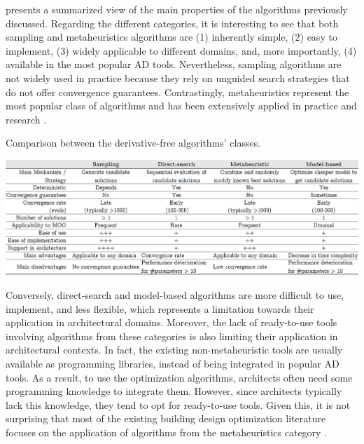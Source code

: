 	 presents a summarized view of the main properties of the algorithms previously discussed. Regarding the different categories, it is interesting to see that both sampling and metaheuristics algorithms are (1) inherently simple, (2) easy to implement, (3) widely applicable to different domains, and, more importantly, (4) available in the most popular \ac{AD} tools. Nevertheless, sampling algorithms are not widely used in practice because they rely on unguided search strategies that do not offer convergence guarantees. Contrastingly, metaheuristics represent the most popular class of algorithms and has been extensively applied in practice and research \cite{Wortmann2017ADO}. 
	\begin{table}[hp]	
		\centering	
		\caption{Comparison between the derivative-free algorithms' classes.}	
		\includegraphics[width=1\textwidth]{tables_and_code/algorithms_comparison.PNG}
		\label{table:compare-dfo-algos}	
	\end{table}
	Conversely, direct-search and model-based algorithms are more difficult to use, implement, and less flexible, which represents a limitation towards their application in architectural domains. Moreover, the lack of ready-to-use tools involving algorithms from these categories is also limiting their application in architectural contexts. In fact, the existing non-metaheuristic tools are usually available as programming libraries, instead of being integrated in popular \ac{AD} tools. As a result, to use the optimization algorithms, architects often need some programming knowledge to integrate them. However, since architects typically lack this knowledge, they tend to opt for ready-to-use tools. Given this, it is not surprising that most of the existing building design optimization literature focuses on the application of algorithms from the metaheuristics category \cite{Evins2013,Nguyen2014,Hamdy2016}. 


